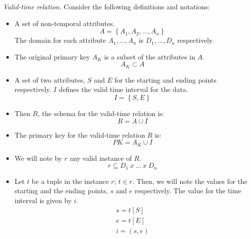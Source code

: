 \begin{definition}
\label{def:valid-time-relation}
\emph{Valid-time relation.}
Consider the following definitions and notations:

\begin{itemize}
 \item A set of non-temporal attributes.
	\begin{equation}
	\label{eq:attribute-set}
	A = \left \lbrace A_1, A_2, \ldots, A_n \right \rbrace
	\end{equation}
      The domain for each attribute $A_1, \ldots, A_n$ is $D_1, \ldots, D_n$ respectively. 
\item The original primary key $A_K$ is a subset of the attributes in $A$.
      \begin{equation}
       \label{eq:primary-key-a}
      A_K \subset A
      \end{equation}
\item A set of two attributes, $S$  and $E$ for the starting and ending points respectively. $I$ defines the valid time interval for the data. 
\begin{equation}
 \label{eq:attribute-time-interval}
I = \left \lbrace S, E \right \rbrace
\end{equation}
\item Then $R$, the schema for the valid-time relation is:
\begin{equation}
 \label{eq:valid-time-relation}
R = A \cup  I
\end{equation}
\item The primary key for the valid-time relation $R$ is:
\begin{equation}
 \label{eq:valid-time-temporal-pk}
PK = A_K \cup I
\end{equation}


\item We will note by $r$ any valid instance of $R$. 
      \begin{equation}
       \label{eq:valid-time-instance}
      r \subseteq D_1\ x\ \ldots\ x\ D_n
      \end{equation}

\item Let $t$ be a tuple in the instance $r$; $t \in r$.
Then, we will note the values for the starting and the ending  points, $s$ and $e$  respectively. The value for the time interval is given by $i$.
      \begin{align}
       \label{eq:starting-point}
      s = t\left[S \right]\\
      e = t\left[E \right]\\
      i = \left(s, e\right)
      \end{align}



\end{itemize}
\end{definition}
